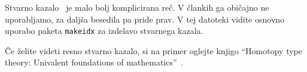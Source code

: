 \documentclass{article}
\begin{document}
Stvarno kazalo%
%
\ je malo bolj komplicirana reč. V člankih ga običajno ne uporabljamo, za daljša besedila pa
pride prav. V tej datoteki vidite osnovno uporabo paketa \texttt{makeidx} za izdelavo
stvarnega kazala.
%

Če želite videti resno stvarno kazalo, si na primer oglejte knjigo ``Homotopy type theory:
Univalent foundations of mathematics''~\cite{hottbook}.







\printindex
\end{document}
